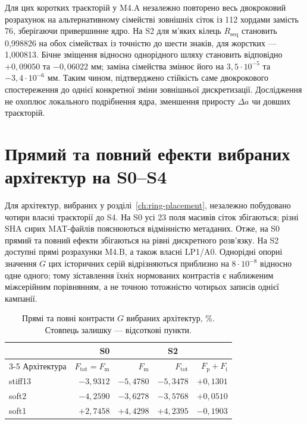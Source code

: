 Для цих коротких траєкторій у M4.A незалежно повторено весь двокроковий розрахунок на альтернативному сімействі зовнішніх сіток із 112 хордами замість 76, зберігаючи привершинне ядро. На S2 для м'яких кілець $R_{\mathrm{seq}}$ становить 0,998826 на обох сімействах із точністю до шести знаків, для жорстких --- 1,000813. Бічне зміщення відносно однорідного шляху становить відповідно $+0{,}09050$ та $-0{,}06022$ мм; заміна сімейства змінює його на $3{,}5\cdot10^{-5}$ та $-3{,}4\cdot10^{-6}$ мм. Таким чином, підтверджено стійкість саме двокрокового спостереження до однієї конкретної зміни зовнішньої дискретизації. Дослідження не охоплює локального подрібнення ядра, зменшення приросту $\Delta a$ чи довших траєкторій.

\section{Прямий та повний ефекти вибраних архітектур на S0--S4}
\label{sec:feedback-existing}

Для архітектур, вибраних у розділі~\ref{ch:ring-placement}, незалежно побудовано чотири власні траєкторії до S4. На S0 усі 23 поля масивів сіток збігаються; різні SHA сирих MAT-файлів пояснюються відмінністю метаданих. Отже, на S0 прямий та повний ефекти збігаються на рівні дискретного розв'язку. На S2 доступні прямі розрахунки M4.B, а також власні LP1/A0. Однорідні опорні значення $G$ цих історичних серій відрізняються приблизно на $8\cdot10^{-8}$ відносно одне одного; тому зіставлення їхніх нормованих контрастів є наближеним міжсерійним порівнянням, а не точною тотожністю чотирьох записів однієї кампанії.

\begin{table}[htbp]
 \centering
 \caption{Прямі та повні контрасти $G$ вибраних архітектур, \%. Стовпець залишку --- відсоткові пункти.}
 \label{tab:feedback-s2}
 \begin{tabular}{lrrrr}
 \toprule
 & S0 & \multicolumn{3}{c}{S2}\\
 \cmidrule(lr){3-5}
 Архітектура & $F_{\mathrm{tot}}=F_{\mathrm m}$ & $F_{\mathrm m}$ & $F_{\mathrm{tot}}$ & $F_{\mathrm p}+F_{\mathrm i}$\\
 \midrule
stiff13 & $-3,9312$ & $-5,4780$ & $-5,3478$ & $+0,1301$ \\
soft2 & $-4,2590$ & $-3,6278$ & $-3,5768$ & $+0,0510$ \\
soft1 & $+2,7458$ & $+4,4298$ & $+4,2395$ & $-0,1903$ \\

 \bottomrule
 \end{tabular}
\end{table}

